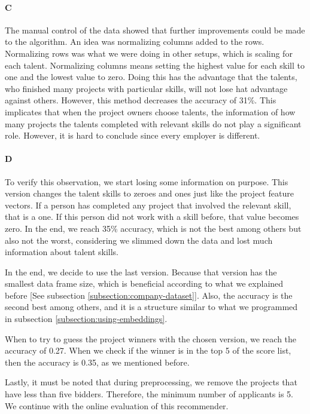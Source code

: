 \paragraph{C} The manual control of the data showed that further improvements could be made to the algorithm. An idea was normalizing columns added to the rows. Normalizing rows was what we were doing in other setups, which is scaling for each talent. Normalizing columns means setting the highest value for each skill to one and the lowest value to zero. Doing this has the advantage that the talents, who finished many projects with particular skills, will not lose hat advantage against others. However, this method decreases the accuracy of 31\%. This implicates that when the project owners choose talents, the information of how many projects the talents completed with relevant skills do not play a significant role. However, it is hard to conclude since every employer is different.

\paragraph{D} To verify this observation, we start losing some information on purpose. This version changes the talent skills to zeroes and ones just like the project feature vectors. If a person has completed any project that involved the relevant skill, that is a one. If this person did not work with a skill before, that value becomes zero. In the end, we reach 35\% accuracy, which is not the best among others but also not the worst, considering we slimmed down the data and lost much information about talent skills.

In the end, we decide to use the last version. Because that version has the smallest data frame size, which is beneficial according to what we explained before [See subsection \ref{subsection:company-dataset}]. Also, the accuracy is the second best among others, and it is a structure similar to what we programmed in subsection \ref{subsection:using-embeddings}.

When to try to guess the project winners with the chosen version, we reach the accuracy of 0.27. When we check if the winner is in the top 5 of the score list, then the accuracy is 0.35, as we mentioned before. 

Lastly, it must be noted that during preprocessing, we remove the projects that have less than five bidders. Therefore, the minimum number of applicants is 5. We continue with the online evaluation of this recommender.

